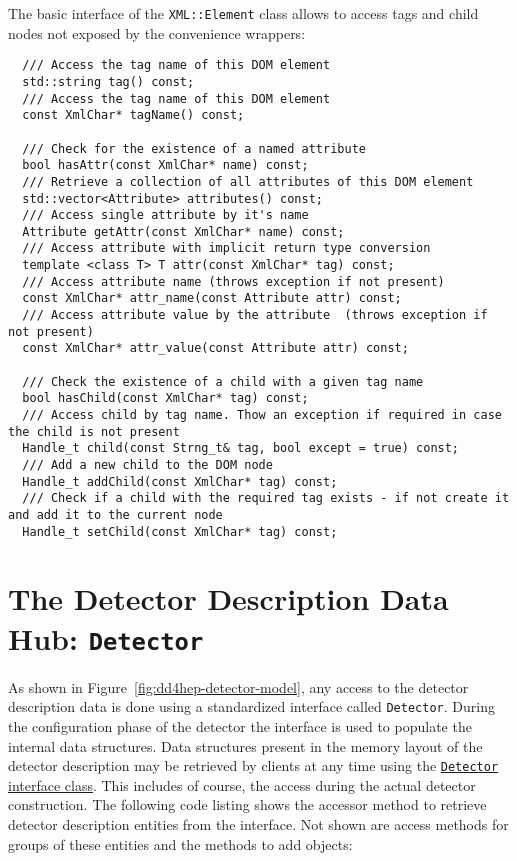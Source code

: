 The basic interface of the \texttt{XML::Element} class allows to access tags and child nodes not exposed by the convenience wrappers:
\begin{verbatim}
  /// Access the tag name of this DOM element
  std::string tag() const;
  /// Access the tag name of this DOM element
  const XmlChar* tagName() const;

  /// Check for the existence of a named attribute
  bool hasAttr(const XmlChar* name) const;
  /// Retrieve a collection of all attributes of this DOM element
  std::vector<Attribute> attributes() const;
  /// Access single attribute by it's name
  Attribute getAttr(const XmlChar* name) const;
  /// Access attribute with implicit return type conversion
  template <class T> T attr(const XmlChar* tag) const;
  /// Access attribute name (throws exception if not present)
  const XmlChar* attr_name(const Attribute attr) const;
  /// Access attribute value by the attribute  (throws exception if not present)
  const XmlChar* attr_value(const Attribute attr) const;

  /// Check the existence of a child with a given tag name
  bool hasChild(const XmlChar* tag) const;
  /// Access child by tag name. Thow an exception if required in case the child is not present
  Handle_t child(const Strng_t& tag, bool except = true) const;
  /// Add a new child to the DOM node
  Handle_t addChild(const XmlChar* tag) const;
  /// Check if a child with the required tag exists - if not create it and add it to the current node
  Handle_t setChild(const XmlChar* tag) const;
\end{verbatim}

\section{The Detector Description Data Hub: \texttt{Detector}}
\label{sec:dd4hep-user-manual-LCDD-hub}
As shown in Figure~\ref{fig:dd4hep-detector-model}, any access to the detector  description data is done using a standardized interface called \texttt{Detector}. During the configuration phase of the detector the interface is used to populate the internal data structures. Data structures present in the memory layout of the detector description may be retrieved by clients at any time using the  \href{https://dd4hep.web.cern.ch/dd4hep/reference/classdd4hep_1_1Detector.html}{\texttt{Detector} interface class}. This includes of course, the access during the actual detector construction. The following code listing shows the accessor method to retrieve  detector description entities from the interface. Not shown are access methods for groups of these entities and the methods to add objects:

